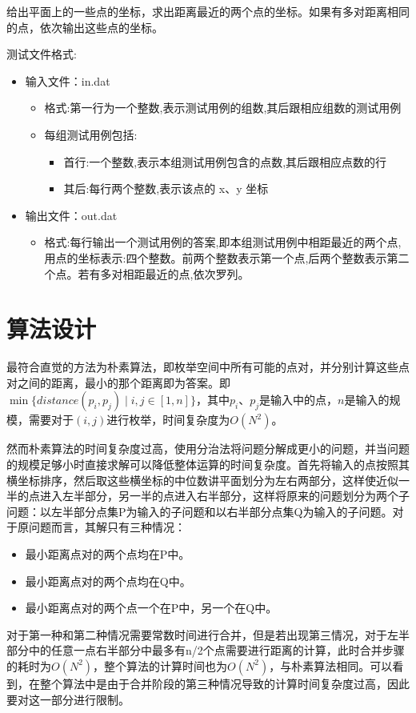 \documentclass{report}
\begin{document}
给出平面上的一些点的坐标，求出距离最近的两个点的坐标。如果有多对距离相同的点，依次输出这些点的坐标。\par
测试文件格式:\par
\begin{itemize}
    \item 输入文件：in.dat
        \begin{itemize}
            \item 格式:第一行为一个整数,表示测试用例的组数,其后跟相应组数的测试用例
            \item 每组测试用例包括:
                \begin{itemize}
                    \item 首行:一个整数,表示本组测试用例包含的点数,其后跟相应点数的行
                    \item 其后:每行两个整数,表示该点的 x、y 坐标
                \end{itemize}
        \end{itemize}
    \item 输出文件：out.dat
        \begin{itemize}
    \item 格式:每行输出一个测试用例的答案,即本组测试用例中相距最近的两个点,用点的坐标表示:四个整数。前两个整数表示第一个点,后两个整数表示第二个点。若有多对相距最近的点,依次罗列。
        \end{itemize}
\end{itemize}

\section{算法设计}
\label{sec:suan_fa_she_ji_1}
最符合直觉的方法为朴素算法，即枚举空间中所有可能的点对，并分别计算这些点对之间的距离，最小的那个距离即为答案。即$\min\{distance(p_i, p_j)\mid i,j\in[1, n]\}$，其中$p_i$、$p_j$是输入中的点，$n$是输入的规模，需要对于$(i, j)$进行枚举，时间复杂度为$O(N^{2})$。\par

然而朴素算法的时间复杂度过高，使用分治法将问题分解成更小的问题，并当问题的规模足够小时直接求解可以降低整体运算的时间复杂度。首先将输入的点按照其横坐标排序，然后取这些横坐标的中位数讲平面划分为左右两部分，这样使近似一半的点进入左半部分，另一半的点进入右半部分，这样将原来的问题划分为两个子问题：以左半部分点集P为输入的子问题和以右半部分点集Q为输入的子问题。对于原问题而言，其解只有三种情况：
\begin{itemize}
    \item 最小距离点对的两个点均在P中。
    \item 最小距离点对的两个点均在Q中。
    \item 最小距离点对的两个点一个在P中，另一个在Q中。
\end{itemize}
对于第一种和第二种情况需要常数时间进行合并，但是若出现第三情况，对于左半部分中的任意一点右半部分中最多有n/2个点需要进行距离的计算，此时合并步骤的耗时为$O(N^{2})$，整个算法的计算时间也为$O(N^{2})$，与朴素算法相同。可以看到，在整个算法中是由于合并阶段的第三种情况导致的计算时间复杂度过高，因此要对这一部分进行限制。\par
\end{document}
